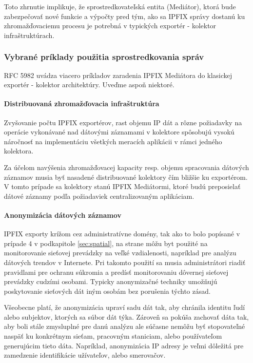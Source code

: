Toto zhrnutie implikuje, že sprostredkovateľská entita (Mediátor), ktorá bude zabezpečovať nové funkcie 
a výpočty pred tým, ako sa IPFIX správy dostanú ku zhromažďovaciemu procesu je potrebná v typických
exportér - kolektor infraštruktúrach.  


\subsubsection{Vybrané príklady použitia sprostredkovania správ} \label{sec:mediator_examples}


RFC 5982 \citep{rfc5982} uvádza viacero príkladov zaradenia IPFIX Mediátora do klasickej
exportér - kolektor architektúry. Uveďme aspoň niektoré.


\paragraph{Distribuovaná zhromažďovacia infraštruktúra}

Zvyšovanie počtu IPFIX exportérov, rast objemu IP dát a rôzne požiadavky na operácie vykonávané nad 
dátovými záznamami v kolektore spôsobujú vysokú náročnosť na implementáciu všetkých meracích
aplikácii v rámci jedného kolektora.

Za účelom navýšenia zhromažďovacej kapacity resp. objemu spracovania dátových záznamov musia byť 
nasadené distribuované kolektory čím bližšie ku exportérom. V tomto prípade sa kolektory stanú 
IPFIX Mediátormi, ktoré budú preposielať dátové záznamy podľa požiadaviek centralizovaným aplikáciam.


\paragraph{Anonymizácia dátových záznamov}

IPFIX exporty krížom cez administratívne domény, tak ako to bolo popísané v prípade 4 
v podkapitole \ref{sec:spatial}, na strane \pageref{sec:spatial} môžu 
byt použité na monitorovanie sieťovej prevádzky na veľké vzdialenosti, 
napríklad pre analýzu dátových trendov v Internete. Pri takomto použití sa musia administrátori riadiť
pravidlami pre ochranu súkromia a predísť monitorovaniu dôvernej sieťovej prevádzky cudzími osobami.
Typicky anonymizačné techniky umožňujú poskytovanie sieťových dát iným osobám bez porušenia týchto zásad.

Všeobecne platí, že anonymizácia upraví sadu dát tak, aby chránila identitu ľudí alebo subjektov, 
ktorých sa súbor dát týka. Zároveň sa pokúša zachovať dáta tak, aby boli stále zmysluplné pre danú 
analýzu ale súčasne nemôžu byť stopovateľné naspäť ku konkrétnym sieťam, pracovným staniciam, alebo 
používateľom generujúcim tieto dáta. Napríklad, anonymizácia IP adresy je veľmi dôležitá pre 
zamedzenie identifikácie užívateľov, alebo smerovačov. 

